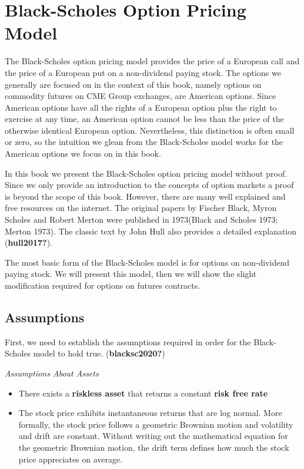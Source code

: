 \documentclass[
  letterpaper,
  DIV=11,
  numbers=noendperiod]{scrreprt}
\begin{document}
\hypertarget{black-scholes-option-pricing-model}{%
\section{Black-Scholes Option Pricing
Model}\label{black-scholes-option-pricing-model}}

The Black-Scholes option pricing model provides the price of a European
call and the price of a European put on a non-dividend paying stock. The
options we generally are focused on in the context of this book, namely
options on commodity futures on CME Group exchanges, are American
options. Since American options have all the rights of a European option
plus the right to exercise at any time, an American option cannot be
less than the price of the otherwise identical European option.
Nevertheless, this distinction is often small or zero, so the intuition
we glean from the Black-Scholes model works for the American options we
focus on in this book.

In this book we present the Black-Scholes option pricing model without
proof. Since we only provide an introduction to the concepts of option
markets a proof is beyond the scope of this book. However, there are
many well explained and free resources on the internet. The original
papers by Fischer Black, Myron Scholes and Robert Merton were published
in 1973(Black and Scholes 1973; Merton 1973). The classic text by John
Hull also provides a detailed explanation (\textbf{hull2017?}).

The most basic form of the Black-Scholes model is for options on
non-dividend paying stock. We will present this model, then we will show
the slight modification required for options on futures contracts.

\hypertarget{assumptions}{%
\subsection{Assumptions}\label{assumptions}}

First, we need to establish the assumptions required in order for the
Black-Scholes model to hold true. (\textbf{blacksc2020?})

\emph{Assumptions About Assets}

\begin{itemize}
\item
  There exists a \textbf{riskless asset} that returns a constant
  \textbf{risk free rate}
\item
  The stock price exhibits instantaneous returns that are log normal.
  More formally, the stock price follows a geometric Brownian motion and
  volatility and drift are constant. Without writing out the
  mathematical equation for the geometric Brownian motion, the drift
  term defines how much the stock price appreciates on average.
\end{itemize}
\end{document}
